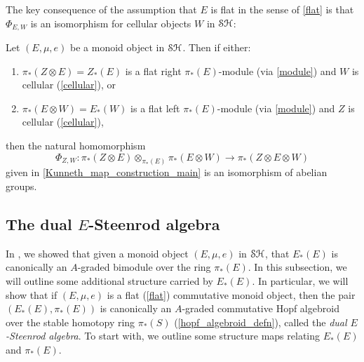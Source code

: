 \documentclass[../main.tex]{subfiles}
\begin{document}
The key consequence of the assumption that $E$ is flat in the sense of \autoref{flat} is that $\Phi_{E,W}$ is an isomorphism for cellular objects $W$ in $\mathcal{SH}$:

\begin{proposition}\label{Kunneth_map_iso_main}
	Let $(E,\mu,e)$ be a monoid object in $\mathcal{SH}$. Then if either:\begin{enumerate}
		\item $\pi_*(Z\otimes E)=Z_*(E)$ is a flat right $\pi_*(E)$-module (via \autoref{module}) and $W$ is cellular (\autoref{cellular}), or
		\item $\pi_*(E\otimes W)=E_*(W)$ is a flat left $\pi_*(E)$-module (via \autoref{module}) and $Z$ is cellular (\autoref{cellular}),
	\end{enumerate} 
	then the natural homomorphism
	\[\Phi_{Z,W}:\pi_*(Z\otimes E)\otimes_{\pi_*(E)}\pi_*(E\otimes W)\to \pi_*(Z\otimes E\otimes W)\]
	given in \autoref{Kunneth_map_construction_main} is an isomorphism of abelian groups.
\end{proposition}

\subsection{The dual \texorpdfstring{$E$}{E}-Steenrod algebra}

In , we showed that given a monoid object $(E,\mu,e)$ in $\mathcal{SH}$, that $E_*(E)$ is canonically an $A$-graded bimodule over the ring $\pi_*(E)$. In this subsection, we will outline some additional structure carried by $E_*(E)$. In particular, we will show that if $(E,\mu,e)$ is a flat (\autoref{flat}) commutative monoid object, then the pair $(E_*(E),\pi_*(E))$ is canonically an $A$-graded commutative Hopf algebroid over the stable homotopy ring $\pi_*(S)$ (\autoref{hopf_algebroid_defn}), called the \emph{dual $E$-Steenrod algebra}. To start with, we outline some structure maps relating $E_*(E)$ and $\pi_*(E)$.
\end{document}
